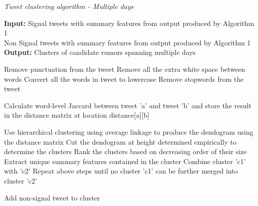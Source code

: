 	\begin{algorithm}[H]
		\caption{{\em Tweet clustering algorithm - Multiple days}}
		\textbf{Input:} Signal tweets with summary features  from output produced by Algorithm 1 \\
		Non Signal tweets with summary features  from output produced by Algorithm 1 \\
		\textbf{Output:} Clusters of candidate rumors spanning multiple days \\ 
		\begin{minipage}{\linewidth}
			\begin{algorithmic}[1]	 	
				\STATE Remove punctuation from the tweet
				\STATE Remove all the extra white space between words
				\STATE Convert all the words in tweet to lowercase
				\STATE Remove stopwords from the tweet	
				\ENDFOR
				
				\STATE Calculate word-level Jaccard between tweet 'a' and tweet 'b' and store the result in the distance matrix at location distance[a][b]
				\ENDFOR
				\ENDFOR
				
				\STATE Use hierarchical clustering using average linkage to produce the dendogram using the distance matrix
				\STATE Cut the dendogram at height determined empirically to determine the clusters
				\STATE Rank the clusters based on decreasing order of their size
				\STATE Extract unique summary features contained in the cluster
				\STATE Combine cluster 'c1' with 'c2'
				\ENDIF
				\STATE Repeat above steps until no cluster 'c1' can be further merged into cluster 'c2'
				
				\STATE Add non-signal tweet to cluster
				\ENDIF	   
				\ENDFOR
				\ENDFOR
			\end{algorithmic}
		\end{minipage}
	\end{algorithm}
	
			 
